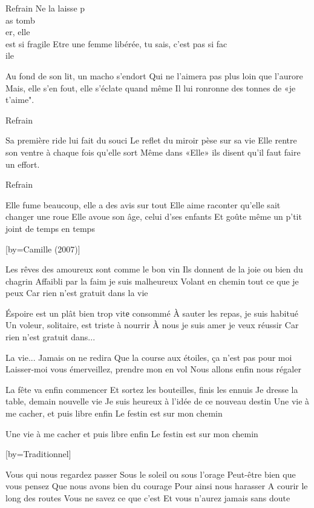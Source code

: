 \beginverse
Refrain
Ne la laisse p\\[Lam]as tomb\\[Fa]er, elle\\[Do] est si fragile
Etre une femme libérée, tu sais, c'est pas si fac\\[Sol]ile
\\[bis]
\endverse

\beginverse
Au fond de son lit, un macho s'endort
Qui ne l'aimera pas plus loin que l'aurore
Mais, elle s'en fout, elle s'éclate quand même
Il lui ronronne des tonnes de «je t'aime".
\endverse

\beginverse
Refrain
\endverse

\beginverse
Sa première ride lui fait du souci
Le reflet du miroir pèse sur sa vie
Elle rentre son ventre à chaque fois qu'elle sort
Même dans «Elle» ils disent qu'il faut faire un effort.
\endverse

\beginverse
Refrain
\endverse

\beginverse
Elle fume beaucoup, elle a des avis sur tout
Elle aime raconter qu'elle sait changer une roue
Elle avoue son âge, celui d'ses enfants
Et goûte même un p'tit joint de temps en temps
\endverse

[by={Camille (2007)}]

\beginverse
Les rêves des amoureux sont comme le bon vin
Ils donnent de la joie ou bien du chagrin
Affaibli par la faim je suis malheureux
Volant en chemin tout ce que je peux
Car rien n'est gratuit dans la vie
\endverse

\beginverse
Éspoire est un plât bien trop vitе consommé
À sauter les repas, je suis habitué
Un voleur, solitaire, est triste à nourrir
À nous je suis amer je veux réussir
Car rien n'est gratuit dans...
\endverse

\beginverse
La vie... Jamais on ne redira
Que la course aux étoiles, ça n'est pas pour moi
Laisser-moi vous émerveillez, prendre mon en vol
Nous allons enfin nous régaler
\endverse

\beginverse
La fête va enfin commencer
Et sortez les bouteilles, finis les ennuis
Je dresse la table, demain nouvelle vie
Je suis heureux à l'idée de ce nouveau destin
Une vie à me cacher, et puis libre enfin
Le festin est sur mon chemin
\endverse

\beginverse
Une vie à me cacher et puis libre enfin
Le festin est sur mon chemin
\endverse

[by={Traditionnel}]

\beginverse
Vous qui nous regardez passer
Sous le soleil ou sous l'orage
Peut-être bien que vous pensez
Que nous avons bien du courage
Pour ainsi nous harasser
A courir le long des routes
Vous ne savez ce que c'est
Et vous n'aurez jamais sans doute
\endverse

